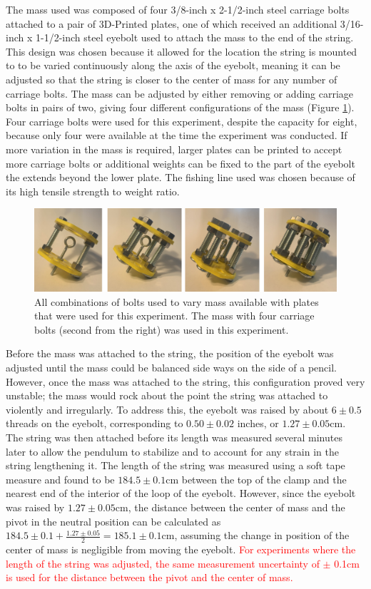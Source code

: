 \documentclass[11pt]{article}
\begin{document}
        The mass used was composed of four 3/8-inch x 2-1/2-inch steel carriage bolts attached to a pair of 3D-Printed plates, one of which received an additional 3/16-inch x 1-1/2-inch steel eyebolt used to attach the mass to the end of the string. This design was chosen because it allowed for the location the string is mounted to to be varied continuously along the axis of the eyebolt, meaning it can be adjusted so that the string is closer to the center of mass for any number of carriage bolts. The mass can be adjusted by either removing or adding carriage bolts in pairs of two, giving four different configurations of the mass (Figure \ref{fig:masses}). Four carriage bolts were used for this experiment, despite the capacity for eight, because only four were available at the time the experiment was conducted. If more variation in the mass is required, larger plates can be printed to accept more carriage bolts or additional weights can be fixed to the part of the eyebolt the extends beyond the lower plate. The fishing line used was chosen because of its high tensile strength to weight ratio. 

        \begin{figure}[H]
            \centering\includegraphics[width = 0.75\linewidth]{allMasses.PNG}
            \caption{All combinations of bolts used to vary mass available with plates that were used for this experiment. The mass with four carriage bolts (second from the right) was used in this experiment.}
            \label{fig:masses}
        \end{figure}

        Before the mass was attached to the string, the position of the eyebolt was adjusted until the mass could be balanced side ways on the side of a pencil. However, once the mass was attached to the string, this configuration proved very unstable; the mass would rock about the point the string was attached to violently and irregularly. To address this, the eyebolt was raised by about $6 \pm 0.5$ threads on the eyebolt, corresponding to $0.50 \pm 0.02$ inches, or $1.27 \pm 0.05$cm. The string was then attached before its length was measured several minutes later to allow the pendulum to stabilize and to account for any strain in the string lengthening it. The length of the string was measured using a soft tape measure and found to be $184.5 \pm 0.1$cm between the top of the clamp and the nearest end of the interior of the loop of the eyebolt. However, since the eyebolt was raised by $1.27 \pm 0.05$cm, the distance between the center of mass and the pivot in the neutral position can be calculated as $184.5 \pm 0.1 + \frac{1.27 \pm 0.05}{2} = 185.1 \pm 0.1$cm, assuming the change in position of the center of mass is negligible from moving the eyebolt. \textcolor{red}{For experiments where the length of the string was adjusted, the same measurement uncertainty of $\pm$ 0.1cm is used for the distance between the pivot and the center of mass.}
\end{document}

